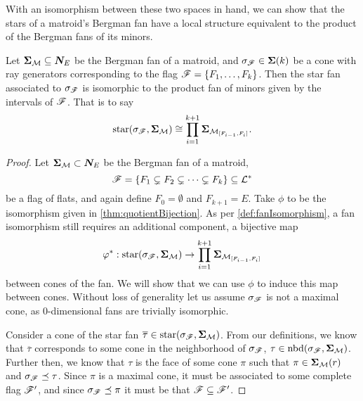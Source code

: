 \documentclass[12pt,oneside]{../../sfsuthesis}
\begin{document}
With an isomorphism between these two spaces in hand, we can show that the stars of a matroid's Bergman fan have a local structure equivalent to the product of the Bergman fans of its minors.
\begin{lemma}\th\label{thm:starBijection}
    Let \( {\bm{\Sigma}}_{\mathcal{M}} \subseteq \bm{N}_E \) be the Bergman fan of a matroid,
    and \( \sigma_{\mathscr{F}} \in {\bm{\Sigma}}(k) \) be a cone with ray generators corresponding to the flag \( \mathscr{F} = \{F_1, \dots, F_k\} \).
    Then the star fan associated to \( \sigma_{\mathscr{F}} \) is isomorphic to the product fan of minors given by the intervals of \( \mathscr{F} \).
    That is to say
    \[
        \operatorname{star}(\sigma_{\mathscr{F}}, {\bm{\Sigma}}_{\mathcal{M}}) \cong \prod_{i=1}^{k+1} {\bm{\Sigma}}_{\mathcal{M}_{[F_{i-1}, F_i]}}.
    \]
\end{lemma}
\begin{proof}
    Let \( {\bm{\Sigma}}_{\mathcal{M}} \subset \bm{N}_E \) be the Bergman fan of a matroid,
    \[
        \mathscr{F} = \{ F_1 \subsetneq F_2 \subsetneq \cdots \subsetneq F_k \} \subseteq \mathcal{L}^\ast
    \]
    be a flag of flats, and again define \( F_0 = \emptyset \) and \( F_{k+1} = E \).
    Take \( \phi \) to be the isomorphism given in \th\ref{thm:quotientBijection}.
    As per \th\ref{def:fanIsomorphism}, a fan isomorphism still requires an additional component, a bijective map
    \[
        \varphi^\ast: \operatorname{star}(\sigma_{\mathscr{F}}, {\bm{\Sigma}}_{\mathcal{M}}) \to \prod_{i=1}^{k+1} {\bm{\Sigma}}_{\mathcal{M}_{[F_{i-1}, F_i]}}
    \]
    between cones of the fan.
    We will show that we can use \( \phi \) to induce this map between cones.
    Without loss of generality let us assume \( \sigma_{\mathscr{F}} \) is not a maximal cone, as 0-dimensional fans are trivially isomorphic.

    Consider a cone of the star fan \( \overline{\tau} \in \operatorname{star}(\sigma_{\mathscr{F}}, {\bm{\Sigma}}_{\mathcal{M}}) \).
    From our definitions, we know that \( \overline{\tau} \) corresponds to some cone in the neighborhood of \( \sigma_{\mathscr{F}} \), \( \tau \in \operatorname{nbd}(\sigma_{\mathscr{F}}, {\bm{\Sigma}}_{\mathcal{M}}) \).
    Further then, we know that \( \tau \) is the face of some cone \( \pi \) such that \( \pi \in {\bm{\Sigma}}_{\mathcal{M}}(r) \) and \( \sigma_{\mathscr{F}} \preceq \tau \).
    Since \( \pi \) is a maximal cone, it must be associated to some complete flag \( \mathscr{F}' \), and since \( \sigma_{\mathscr{F}} \preceq \pi \) it must be that \( \mathscr{F} \subseteq \mathscr{F}' \).


\end{proof}
\end{document}
